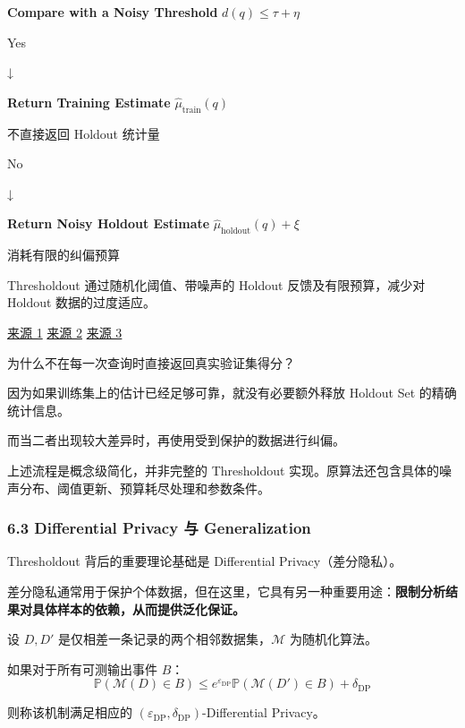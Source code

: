 \textbf{Compare with a Noisy Threshold} \(d(q)\leq\tau+\eta\)

Yes

↓

\textbf{Return Training Estimate} \(\widehat\mu_{\mathrm{train}}(q)\)

不直接返回 Holdout 统计量

No

↓

\textbf{Return Noisy Holdout Estimate} \(\widehat\mu_{\mathrm{holdout}}(q)+\xi\)

消耗有限的纠偏预算

Thresholdout 通过随机化阈值、带噪声的 Holdout 反馈及有限预算，减少对 Holdout 数据的过度适应。

\href{https://papers.neurips.cc/paper_files/paper/2015/hash/bad5f33780c42f2588878a9d07405083-Abstract.html}{来源 1} \href{https://www.sciencemagazinedigital.org/sciencemagazine/7_august_2015?pg=93}{来源 2} \href{https://ibmresearchnews.blogspot.com/2015/08/preserving-validity-in-adaptive-data_6.html}{来源 3}

为什么不在每一次查询时直接返回真实验证集得分？

因为如果训练集上的估计已经足够可靠，就没有必要额外释放 Holdout Set 的精确统计信息。

而当二者出现较大差异时，再使用受到保护的数据进行纠偏。

上述流程是概念级简化，并非完整的 Thresholdout 实现。原算法还包含具体的噪声分布、阈值更新、预算耗尽处理和参数条件。

\hypertarget{part-2-20-0001-differential-privacy-ux4e0e-generalization}{%
\subsubsection{6.3 Differential Privacy 与 Generalization}\label{part-2-20-0001-differential-privacy-ux4e0e-generalization}}

Thresholdout 背后的重要理论基础是 Differential Privacy（差分隐私）。

差分隐私通常用于保护个体数据，但在这里，它具有另一种重要用途：\textbf{限制分析结果对具体样本的依赖，从而提供泛化保证。}

设 \(D,D'\) 是仅相差一条记录的两个相邻数据集，\(\mathcal M\) 为随机化算法。

如果对于所有可测输出事件 \(B\)：
\[\boxed{
\mathbb P(\mathcal M(D)\in B)
\leq
e^{\varepsilon_{\mathrm{DP}}}
\mathbb P(\mathcal M(D')\in B)
+
\delta_{\mathrm{DP}}
}\]

则称该机制满足相应的 \((\varepsilon_{\mathrm{DP}},\delta_{\mathrm{DP}})\)-Differential Privacy。

